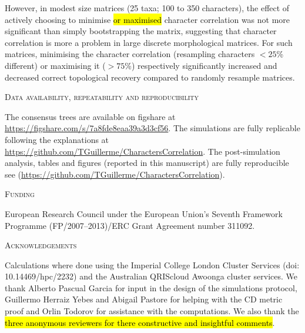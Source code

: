 \documentclass[12pt,letterpaper]{article}
\renewcommand{\section}[1]{%
\bigskip
\begin{center}
\begin{Large}
\normalfont\scshape #1
\medskip
\end{Large}
\end{center}}
\begin{document}
However, in modest size matrices (25 taxa; 100 to 350 characters), the effect of actively choosing to minimise \hl{or maximised} character correlation was not more significant than simply bootstrapping the matrix, suggesting that character correlation is more a problem in large discrete morphological matrices.
For such matrices, minimising the character correlation (resampling characters $<25$\% different) or maximising it ($>75$\%) respectively significantly increased and decreased correct topological recovery compared to randomly resample matrices.


\section{Data availability, repeatability and reproducibility}
The consensus trees are available on figshare at \url{https://figshare.com/s/7a8fde8eaa39a3d3cf56}.
The simulations are fully replicable following the explanations at \url{https://github.com/TGuillerme/CharactersCorrelation}.
The post-simulation analysis, tables and figures (reported in this manuscript) are fully reproducible see (\url{https://github.com/TGuillerme/CharactersCorrelation}).

\section{Funding}
European Research Council under the European Union’s Seventh Framework Programme (FP/2007–2013)/ERC Grant Agreement number 311092.

\section{Acknowledgements}
Calculations where done using the Imperial College London Cluster Services (doi: 10.14469/hpc/2232) and the Australian QRIScloud Awoonga cluster services. We thank Alberto Pascual Garcia for input in the design of the simulations protocol, Guillermo Herraiz Yebes and Abigail Pastore for helping with the CD metric proof and Orlin Todorov for assistance with the computations. We also thank the \hl{three anonymous reviewers for there constructive and insightful comments}.



\end{document}
